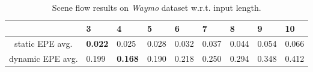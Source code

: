 
\begin{table}[t]
    \setlength{\tabcolsep}{6pt}
    \renewcommand{\arraystretch}{1.2}
	\centering
    \begin{tabularx}{\textwidth}{c|YYYYYYYY}
    \toprule
    & 3 & 4 & 5 & 6 & 7 & 8 & 9 & 10 \\
    \midrule
    static EPE avg. & \textbf{0.022} & 0.025 & 0.028 & 0.032 & 0.037 & 0.044 & 0.054 & 0.066\\
    dynamic EPE avg. & 0.199 & \textbf{0.168} & 0.190 & 0.218 & 0.250 & 0.294 & 0.348 & 0.412 \\
    \bottomrule
    \end{tabularx}
    \caption{Scene flow results on \emph{Waymo} dataset w.r.t. input length.}
    \label{tab:generalisation}
\end{table}